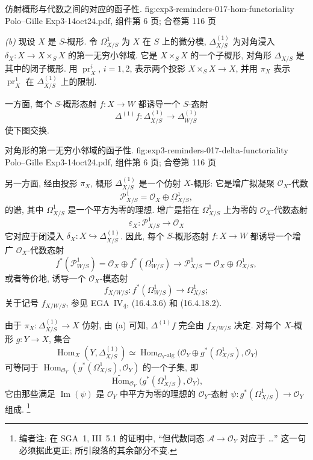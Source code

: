   {仿射概形与代数之间的对应的函子性.}
  {fig:exp3-reminders-017-hom-functoriality}
  {Polo--Gille Exp3-14oct24.pdf, 组件第 6 页; 合卷第 116 页}

\smallskip
\noindent{}\textit{(b)}
现设 \(X\) 是 \(S\)-概形. 令 \(\Omega^1_{X/S}\) 为 \(X\) 在
\(S\) 上的微分模, \(\Delta^{(1)}_{X/S}\) 为对角浸入
\(\delta_X:X\to X\times_S X\) 的第一无穷小邻域.
它是 \(X\times_S X\) 的一个子概形, 对角形 \(\Delta_{X/S}\)
是其中的闭子概形. 用 \(\operatorname{pr}^i_X\), \(i=1,2\),
表示两个投影 \(X\times_S X\to X\), 并用 \(\pi_X\) 表示
\(\operatorname{pr}^1_X\) 在 \(\Delta^{(1)}_{X/S}\) 上的限制.

一方面, 每个 \(S\)-概形态射 \(f:X\to W\) 都诱导一个
\(S\)-态射
\[
 \Delta^{(1)}f:\Delta^{(1)}_{X/S}\longrightarrow
 \Delta^{(1)}_{W/S}
\]
使下图交换.

  {对角形的第一无穷小邻域的函子性.}
  {fig:exp3-reminders-017-delta-functoriality}
  {Polo--Gille Exp3-14oct24.pdf, 组件第 6 页; 合卷第 116 页}

另一方面, 经由投影 \(\pi_X\), 概形 \(\Delta^{(1)}_{X/S}\)
是一个仿射 \(X\)-概形: 它是增广拟凝聚 \(\mathscr O_X\)-代数
\[
 \mathscr P^1_{X/S}=\mathscr O_X\oplus\Omega^1_{X/S},
\]
的谱, 其中 \(\Omega^1_{X/S}\) 是一个平方为零的理想.
增广是指在 \(\Omega^1_{X/S}\) 上为零的 \(\mathscr O_X\)-代数态射
\[
 \varepsilon_X:\mathscr P^1_{X/S}\longrightarrow\mathscr O_X
\]
它对应于闭浸入 \(\delta_X:X\hookrightarrow\Delta^{(1)}_{X/S}\).
因此, 每个 \(S\)-概形态射 \(f:X\to W\) 都诱导一个增广
\(\mathscr O_X\)-代数态射
\[
 f^*(\mathscr P^1_{W/S})
 =\mathscr O_X\oplus f^*(\Omega^1_{W/S})
 \longrightarrow
 \mathscr P^1_{X/S}=\mathscr O_X\oplus\Omega^1_{X/S},
\]
或者等价地, 诱导一个 \(\mathscr O_X\)-模态射
\[
 f_{X/W/S}:f^*(\Omega^1_{W/S})\longrightarrow\Omega^1_{X/S};
\]
关于记号 \(f_{X/W/S}\), 参见 EGA~IV\textsubscript{4},
(16.4.3.6) 和 (16.4.18.2).

由于 \(\pi_X:\Delta^{(1)}_{X/S}\to X\) 仿射, 由 (a) 可知,
\(\Delta^{(1)}f\) 完全由 \(f_{X/W/S}\) 决定. 对每个
\(X\)-概形 \(g:Y\to X\), 集合
\[
 \operatorname{Hom}_X(Y,\Delta^{(1)}_{X/S})
 \simeq
 \operatorname{Hom}_{\mathscr O_Y\text{-}\mathrm{alg}}
 \bigl(\mathscr O_Y\oplus g^*(\Omega^1_{X/S}),\mathscr O_Y\bigr)
\]
可等同于 \(\operatorname{Hom}_{\mathscr O_Y}
 (g^*(\Omega^1_{X/S}),\mathscr O_Y)\) 的一个子集, 即
\[
 \widetilde{\operatorname{Hom}}_{\mathscr O_Y}
 \bigl(g^*(\Omega^1_{X/S}),\mathscr O_Y\bigr),
\]
它由那些满足 \(\operatorname{Im}(\psi)\) 是 \(\mathscr O_Y\)
中平方为零的理想的 \(\mathscr O_Y\)-态射
\(\psi:g^*(\Omega^1_{X/S})\to\mathscr O_Y\) 组成.
\footnote{编者注: 在 SGA~1, III~5.1 的证明中,
``但代数同态 \(\mathscr A\to\mathscr O_Y\) 对应于 \ldots''
这一句必须据此更正; 所引段落的其余部分不变.}

